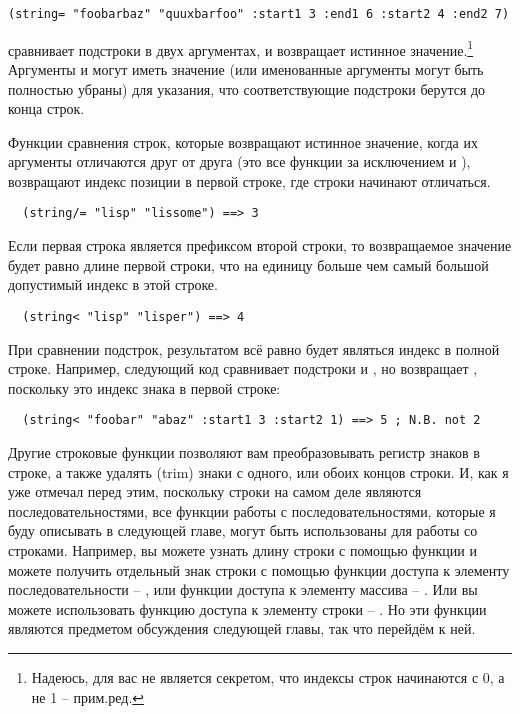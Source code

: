 \begin{lstlisting}
(string= "foobarbaz" "quuxbarfoo" :start1 3 :end1 6 :start2 4 :end2 7)
\end{lstlisting}

сравнивает подстроки  в двух аргументах, и возвращает истинное
значение.\footnote{Надеюсь, для вас не является секретом, что индексы строк начинаются с
  0, а не 1 -- прим.ред.}  Аргументы  и  могут иметь значение
 (или именованные аргументы могут быть полностью убраны) для указания, что
соответствующие подстроки берутся до конца строк.

Функции сравнения строк, которые возвращают истинное значение, когда их аргументы
отличаются друг от друга (это все функции за исключением  и
), возвращают индекс позиции в первой строке, где строки начинают
отличаться.

\begin{lstlisting}
  (string/= "lisp" "lissome") ==> 3
\end{lstlisting}

Если первая строка является префиксом второй строки, то возвращаемое значение будет равно
длине первой строки, что на единицу больше чем самый большой допустимый индекс в этой
строке.

\begin{lstlisting}
  (string< "lisp" "lisper") ==> 4
\end{lstlisting}

При сравнении подстрок, результатом всё равно будет являться индекс в полной строке.
Например, следующий код сравнивает подстроки  и , но возвращает
, поскольку это индекс знака  в первой строке:

\begin{lstlisting}
  (string< "foobar" "abaz" :start1 3 :start2 1) ==> 5 ; N.B. not 2
\end{lstlisting}

Другие строковые функции позволяют вам преобразовывать регистр знаков в строке, а также
удалять (trim) знаки с одного, или обоих концов строки.  И, как я уже отмечал перед этим,
поскольку строки на самом деле являются последовательностями, все функции работы с
последовательностями, которые я буду описывать в следующей главе, могут быть использованы
для работы со строками.  Например, вы можете узнать длину строки с помощью функции
 и можете получить отдельный знак строки с помощью функции доступа к элементу
последовательности -- , или функции доступа к элементу массива -- .
Или вы можете использовать функцию доступа к элементу строки -- .  Но эти
функции являются предметом обсуждения следующей главы, так что перейдём к ней.

